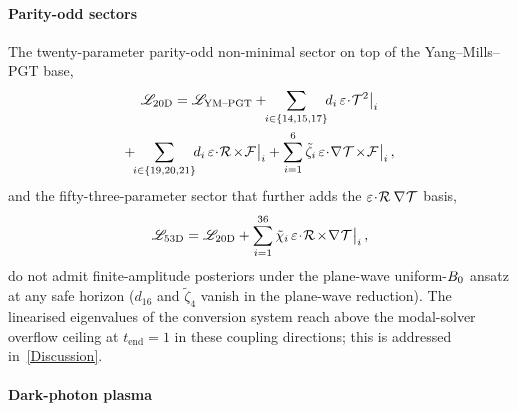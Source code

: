 \paragraph*{Parity-odd sectors}%
\label{ParityOddGeomIncomp}
The twenty-parameter parity-odd non-minimal sector on top of the
Yang--Mills--PGT base,
\begin{multline}
  \lag_{20\text{D}}
    = \lag_\text{YM--PGT}
      + \!\!\sum_{i \in \{14,15,17\}}\!\!
        d_i\,\varepsilon\!\cdot\!\MAGT{^2}\bigr|_{i} \\
      + \!\!\sum_{i \in \{19,20,21\}}\!\!
        d_i\,\varepsilon\!\cdot\!\MAGF{}\!\times\!\FieldF{}\bigr|_{i}
      + \sum_{i=1}^{6}\tilde\zeta_i\,
        \varepsilon\!\cdot\!\rcD{}\MAGT{}\!\times\!\FieldF{}\bigr|_{i} \, ,
  \label{ParityOdd20D}
\end{multline}
and the fifty-three-parameter sector that further adds the
$\varepsilon\!\cdot\!\MAGF{}\,\rcD{}\MAGT{}$ basis,
\begin{align*}
  \lag_{53\text{D}}
    = \lag_{20\text{D}}
       + \sum_{i=1}^{36}\tilde\chi_i\,
        \varepsilon\!\cdot\!\MAGF{}\!\times\!\rcD{}\MAGT{}\bigr|_{i} \, ,
\end{align*}
do not admit finite-amplitude posteriors under the plane-wave
uniform-$B_0$ ansatz at any safe horizon ($d_{16}$ and
$\tilde\zeta_4$ vanish in the plane-wave reduction). The linearised
eigenvalues of the conversion system reach above the modal-solver
overflow ceiling at $t_\text{end} = 1$ in these coupling directions;
this is addressed in~\cref{Discussion}.

\paragraph*{Dark-photon plasma}


